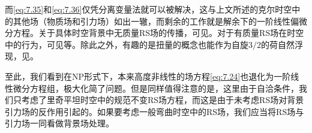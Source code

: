 而\ref{eq:7.35}和\ref{eq:7.36}仅凭分离变量法就可以被解决，这与上文所述的克尔时空中的其他场（物质场和引力场）如出一辙，而剩余的工作就是解余下的一阶线性偏微分方程。关于具体时空背景中无质量RS场的传播，可见\parencite{torres_del_castillo_spin32_1989,del_castillo_rarita-schwinger_1990,del_castillo_spin-_1992,einstein_solutions_1979,szereszewski_solutions_2002,chen_gravitino_2015,torres_del_castillo_debye_1989,fordy_zero-rest-mass_1977,zecca_separation_1996}。对于有质量RS场在时空中的行为，可见\parencite{zecca_massive_2006,acik_spin-12_2018,schenkel_quantization_2012}等。除此之外，有趣的是扭量的概念也能作为自旋$3/2$的荷自然浮现，见\parencite{zichichi_twistors_1991,hayashi_spin-32_2001}。



至此，我们看到在NP形式下，本来高度非线性的场方程\ref{eq:7.24}也退化为一阶线性微分方程组，极大化简了问题。但是同样值得注意的是，这里由于自洽条件，我们只考虑了里奇平坦时空中的规范不变RS场方程，而这是由于未考虑RS场对背景引力场的反作用引起的。如果要考虑一般弯曲时空中的RS场，我们应当将RS场与引力场一同看做背景场处理。